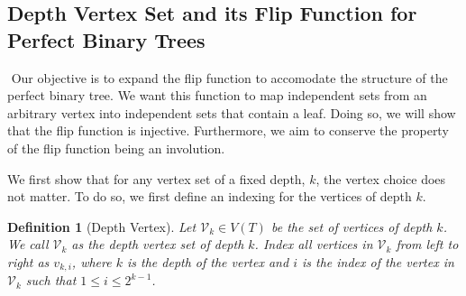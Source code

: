\documentclass{amsart}
\newtheorem{definition}[theorem]{Definition}
\theoremstyle{definition}
\begin{document}
\subsection{Depth Vertex Set and its Flip Function for Perfect Binary Trees}\label{Flip For Perfect Binary Trees}
$ $
Our objective is to expand the flip function to accomodate the structure of the perfect binary tree. We want this function to map independent sets from an arbitrary vertex into independent sets that contain a leaf. Doing so, we will show that the flip function is injective. Furthermore, we aim to conserve the property of the flip function being an involution.

We first show that for any vertex set of a fixed depth, $k$, the vertex choice does not matter. To do so, we first define an indexing for the vertices of depth $k$.

\begin{definition}[Depth Vertex]
  Let $\mathcal{V}_k \in V(T)$ be the set of vertices of depth $k$. We call $\mathcal{V}_k$ as the depth vertex set of depth $k$. Index all vertices in $\mathcal{V}_k$ from left to right as $v_{k, i}$, where $k$ is the depth of the vertex and $i$ is the index of the vertex in $\mathcal{V}_k$ such that $1 \leq i \leq 2^{k - 1}$.
\end{definition}

\begin{figure}
  \centering

\end{figure}
\end{document}
